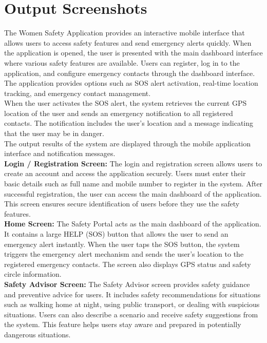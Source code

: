 \documentclass[a4paper,12pt]{report}
\begin{document}
\section{Output Screenshots}

The Women Safety Application provides an interactive mobile interface that allows users to access safety features and send emergency alerts quickly. When the application is opened, the user is presented with the main dashboard interface where various safety features are available.
Users can register, log in to the application, and configure emergency contacts through the dashboard interface. The application provides options such as SOS alert activation, real-time location tracking, and emergency contact management.\\

When the user activates the SOS alert, the system retrieves the current GPS location of the user and sends an emergency notification to all registered contacts. The notification includes the user’s location and a message indicating that the user may be in danger.
\\


The output results of the system are displayed through the mobile application interface and notification messages.\\


\textbf{Login / Registration Screen:} The login and registration screen allows users to create an account and access the application securely. Users must enter their basic details such as full name and mobile number to register in the system. After successful registration, the user can access the main dashboard of the application. This screen ensures secure identification of users before they use the safety features.\\

\textbf{Home Screen:} The Safety Portal acts as the main dashboard of the application. It contains a large HELP (SOS) button that allows the user to send an emergency alert instantly. When the user taps the SOS button, the system triggers the emergency alert mechanism and sends the user’s location to the registered emergency contacts. The screen also displays GPS status and safety circle information.\\

\textbf{Safety Advisor Screen:} The Safety Advisor screen provides safety guidance and preventive advice for users. It includes safety recommendations for situations such as walking home at night, using public transport, or dealing with suspicious situations. Users can also describe a scenario and receive safety suggestions from the system. This feature helps users stay aware and prepared in potentially dangerous situations.\\
\end{document}
